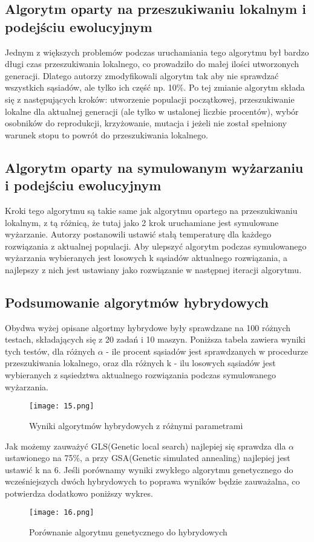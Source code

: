 \documentclass{article}
\begin{document}
\subsection{Algorytm oparty na przeszukiwaniu lokalnym i podejściu ewolucyjnym}
 Jednym z większych problemów podczas uruchamiania tego algorytmu był bardzo długi czas przeszukiwania lokalnego, co prowadziło do małej ilości utworzonych generacji. Dlatego autorzy zmodyfikowali algorytm tak aby nie sprawdzać wszystkich sąsiadów, ale tylko ich część np. 10\%. Po tej zmianie algorytm składa się z następujących kroków: utworzenie populacji początkowej, przeszukiwanie lokalne dla aktualnej generacji (ale tylko w ustalonej liczbie procentów), wybór osobników do reprodukcji, krzyżowanie, mutacja i jeżeli nie został spełniony warunek stopu to powrót do przeszukiwania lokalnego.

\subsection{Algorytm oparty na symulowanym wyżarzaniu i podejściu ewolucyjnym}
 Kroki tego algorytmu są takie same jak algorytmu opartego na przeszukiwaniu lokalnym, z tą różnicą, że tutaj jako 2 krok uruchamiane jest symulowane wyżarzanie. Autorzy postanowili ustawić stałą temperaturę dla każdego rozwiązania z aktualnej populacji. Aby ulepszyć algorytm podczas symulowanego wyżarzania wybieranych jest losowych k sąsiadów aktualnego rozwiązania, a najlepszy z nich jest ustawiany jako rozwiązanie w następnej iteracji algorytmu.

\subsection{Podsumowanie algorytmów hybrydowych}
 Obydwa wyżej opisane algortmy hybrydowe były sprawdzane na 100 różnych testach, składających się z 20 zadań i 10 maszyn. Poniższa tabela zawiera wyniki tych testów, dla różnych $\alpha$ - ile procent sąsiadów jest sprawdzanych w procedurze przeszukiwania lokalnego, oraz dla różnych k - ilu losowych sąsiadów jest wybieranych z sąsiedztwa aktualnego rozwiązania podczas symulowanego wyżarzania.
 \begin{figure}[H]
 \centering
 \texttt{[image: 15.png]}
 \caption{Wyniki algorytmów hybrydowych z różnymi parametrami}
 \end{figure}
 Jak możemy zauważyć GLS(Genetic local search) najlepiej się sprawdza dla $\alpha$ ustawionego na 75\%, a przy GSA(Genetic simulated annealing) najlepiej jest ustawić k na 6. Jeśli porównamy wyniki zwykłego algorytmu genetycznego do wcześniejszych dwóch hybrydowych to poprawa wyników będzie zauważalna, co potwierdza dodatkowo poniższy wykres.
 \begin{figure}[H]
 \centering
 \texttt{[image: 16.png]}
 \caption{Porównanie algorytmu genetycznego do hybrydowych}
 \end{figure}
\end{document}
